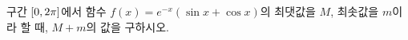 구간 $[0{,}\mkern3mu\mathopen{}2\pi]$에서 함수 $f(x)=e^{-x}(\sin x+\cos x)$의 최댓값을 $M$, 최솟값을 $m$이라 할 때, $M+m$의 값을 구하시오.
